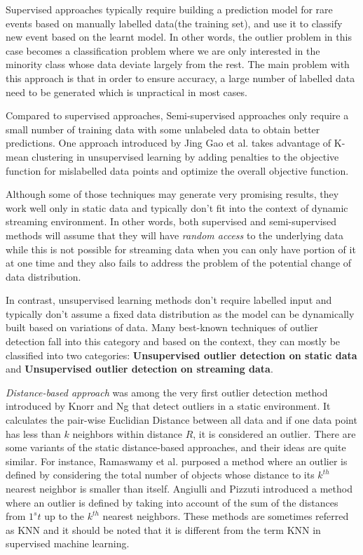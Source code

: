\documentclass[11pt]{article}       %
\begin{document}
Supervised approaches typically require building a prediction model for rare events based on manually labelled data(the training set), and use it to classify new event based on the learnt model\cite{Joshi:2001:MNH:376284.375673,sup02}. In other words, the outlier problem in this case becomes a classification problem where we are only interested in the minority class whose data deviate largely from the rest. The main problem with this approach is that in order to ensure accuracy, a large number of labelled data need to be generated which is unpractical in most cases.
 
Compared to supervised approaches, Semi-supervised approaches\cite{Basu:2004:PFS:1014052.1014062,semi-sup02} only require a small number of training data with some unlabeled data to obtain better predictions. One approach introduced by Jing Gao et al.\cite{Gao:2006:SOD:1141277.1141421} takes advantage of K-mean clustering in unsupervised learning by adding penalties to the objective function for mislabelled data points and optimize the overall objective function. 

Although some of those techniques may generate very promising results, they work well only in static data and typically don't fit into the context of dynamic streaming environment. In other words, both supervised and semi-supervised methods will assume that they will have \textit{random access} to the underlying data while this is not possible for streaming data when you can only have portion of it at one time and they also fails to address the problem of the potential change of data distribution.

In contrast, unsupervised learning methods don't require labelled input and typically don't assume a fixed data distribution as the model can be dynamically built based on variations of data. Many best-known techniques of outlier detection fall into this category and based on the context, they can mostly be classified into two categories: \textbf{Unsupervised outlier detection on static data} and \textbf{Unsupervised outlier detection on streaming data}. 

\textit{Distance-based approach} was among the very first outlier detection method introduced by Knorr and Ng\cite{EKnorr:1998} that detect outliers in a static environment. It calculates the pair-wise Euclidian Distance between all data and if one data point has less than $k$ neighbors within distance $R$, it is considered an outlier. There are some variants of the static distance-based approaches, and their ideas are quite similar. For instance, Ramaswamy et al.\cite{Ramaswamy:2000:EAM:342009.335437} purposed a method where an outlier is defined by considering the total number of objects whose distance to its $k^{th}$ nearest neighbor is smaller than itself. Angiulli and Pizzuti\cite{1377172} introduced a method where an outlier is defined by taking into account of the sum of the distances from $1^st$ up to the $k^{th}$ nearest neighbors. These methods are sometimes referred as KNN and it should be noted that it is different from the term KNN in supervised machine learning. 
\end{document}
